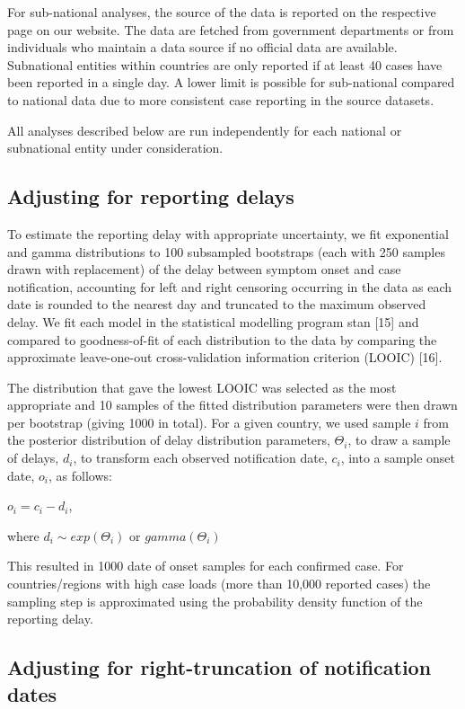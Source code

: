 \documentclass[]{article}
\begin{document}
For sub-national analyses, the source of the data is reported on the
respective page on our website. The data are fetched from government
departments or from individuals who maintain a data source if no
official data are available. Subnational entities within countries are
only reported if at least 40 cases have been reported in a single day. A
lower limit is possible for sub-national compared to national data due
to more consistent case reporting in the source datasets.

All analyses described below are run independently for each national or
subnational entity under consideration.

\hypertarget{adjusting-for-reporting-delays}{%
\subsection{Adjusting for reporting
delays}\label{adjusting-for-reporting-delays}}

To estimate the reporting delay with appropriate uncertainty, we fit
exponential and gamma distributions to 100 subsampled bootstraps (each
with 250 samples drawn with replacement) of the delay between symptom
onset and case notification, accounting for left and right censoring
occurring in the data as each date is rounded to the nearest day and
truncated to the maximum observed delay. We fit each model in the
statistical modelling program stan {[}15{]} and compared to
goodness-of-fit of each distribution to the data by comparing the
approximate leave-one-out cross-validation information criterion (LOOIC)
{[}16{]}.

The distribution that gave the lowest LOOIC was selected as the most
appropriate and 10 samples of the fitted distribution parameters were
then drawn per bootstrap (giving 1000 in total). For a given country, we
used sample \(i\) from the posterior distribution of delay distribution
parameters, \(\Theta_i\), to draw a sample of delays, \(d_i\), to
transform each observed notification date, \(c_i\), into a sample onset
date, \(o_i\), as follows:

\(o_i = c_i - d_i\),

where \(d_i \sim exp(\Theta_i)\) or \(gamma(\Theta_i)\)

This resulted in 1000 date of onset samples for each confirmed case. For
countries/regions with high case loads (more than 10,000 reported cases)
the sampling step is approximated using the probability density function
of the reporting delay.

\hypertarget{adjusting-for-right-truncation-of-notification-dates}{%
\subsection{Adjusting for right-truncation of notification
dates}\label{adjusting-for-right-truncation-of-notification-dates}}
\end{document}
